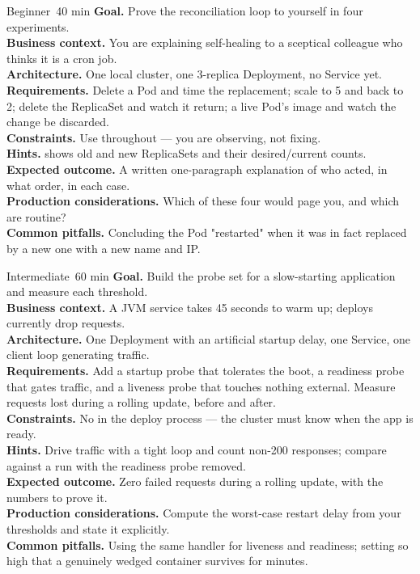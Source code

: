 \begin{minilab}{Beginner}{~40 min}
\textbf{Goal.} Prove the reconciliation loop to yourself in four experiments.\\
\textbf{Business context.} You are explaining self-healing to a sceptical colleague who thinks it is a cron job.\\
\textbf{Architecture.} One local cluster, one 3-replica Deployment, no Service yet.\\
\textbf{Requirements.} Delete a Pod and time the replacement; scale to 5 and back to 2; delete the ReplicaSet and watch it return;  a live Pod's image and watch the change be discarded.\\
\textbf{Constraints.} Use  throughout --- you are observing, not fixing.\\
\textbf{Hints.}  shows old and new ReplicaSets and their desired/current counts.\\
\textbf{Expected outcome.} A written one-paragraph explanation of who acted, in what order, in each case.\\
\textbf{Production considerations.} Which of these four would page you, and which are routine?\\
\textbf{Common pitfalls.} Concluding the Pod "restarted" when it was in fact replaced by a new one with a new name and IP.
\end{minilab}

\begin{minilab}{Intermediate}{~60 min}
\textbf{Goal.} Build the probe set for a slow-starting application and measure each threshold.\\
\textbf{Business context.} A JVM service takes 45 seconds to warm up; deploys currently drop requests.\\
\textbf{Architecture.} One Deployment with an artificial startup delay, one Service, one client loop generating traffic.\\
\textbf{Requirements.} Add a startup probe that tolerates the boot, a readiness probe that gates traffic, and a liveness probe that touches nothing external. Measure requests lost during a rolling update, before and after.\\
\textbf{Constraints.} No  in the deploy process --- the cluster must know when the app is ready.\\
\textbf{Hints.} Drive traffic with a tight  loop and count non-200 responses; compare against a run with the readiness probe removed.\\
\textbf{Expected outcome.} Zero failed requests during a rolling update, with the numbers to prove it.\\
\textbf{Production considerations.} Compute the worst-case restart delay from your thresholds and state it explicitly.\\
\textbf{Common pitfalls.} Using the same handler for liveness and readiness; setting  so high that a genuinely wedged container survives for minutes.
\end{minilab}

